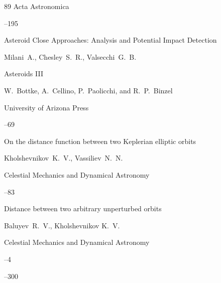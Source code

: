 \begin{thebibliography}{89}
\jour Acta Astronomica 




--195





\paper Asteroid Close Approaches: Analysis and Potential Impact Detection

\by Milani~A., Chesley~S.~R., Valsecchi~G.~B.

\inbook Asteroids III  

\eds W.~Bottke, A.~Cellino, P.~Paolicchi, and R.~P.~Binzel

\publ University of Arizona Press


--69





\paper On the distance function between two Keplerian elliptic orbits

\by Kholshevnikov~K.~V., Vassiliev~N.~N.

\jour Celestial Mechanics and Dynamical Astronomy




--83






\paper Distance between two arbitrary unperturbed orbits

\by Baluyev~R.~V., Kholshevnikov K.~V.

\jour Celestial Mechanics and Dynamical Astronomy



--4

–300







\end{thebibliography}
